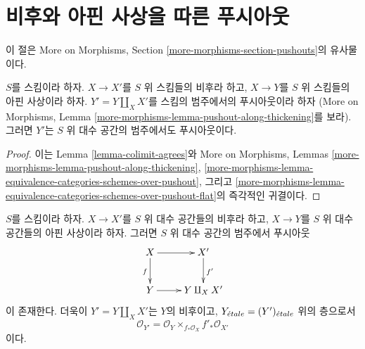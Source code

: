 \section{비후와 아핀 사상을 따른 푸시아웃}
\label{section-pushouts}

\noindent
이 절은 More on Morphisms, Section
\ref{more-morphisms-section-pushouts}의 유사물이다.

\begin{lemma}
\label{lemma-pushout-along-thickening-schemes}
$S$를 스킴이라 하자. $X \to X'$를 $S$ 위 스킴들의 비후라 하고,
$X \to Y$를 $S$ 위 스킴들의 아핀 사상이라 하자.
$Y' = Y \amalg_X X'$를 스킴의 범주에서의 푸시아웃이라 하자
(More on Morphisms, Lemma
\ref{more-morphisms-lemma-pushout-along-thickening}를 보라).
그러면 $Y'$는 $S$ 위 대수 공간의 범주에서도 푸시아웃이다.
\end{lemma}

\begin{proof}
이는 Lemma \ref{lemma-colimit-agrees}와 More on Morphisms, Lemmas
\ref{more-morphisms-lemma-pushout-along-thickening},
\ref{more-morphisms-lemma-equivalence-categories-schemes-over-pushout}, 그리고
\ref{more-morphisms-lemma-equivalence-categories-schemes-over-pushout-flat}의
즉각적인 귀결이다.
\end{proof}

\begin{lemma}
\label{lemma-pushout-along-thickening}
$S$를 스킴이라 하자. $X \to X'$를 $S$ 위 대수 공간들의 비후라 하고,
$X \to Y$를 $S$ 위 대수 공간들의 아핀 사상이라 하자.
그러면 $S$ 위 대수 공간의 범주에서 푸시아웃
$$
\xymatrix{
X \ar[r] \ar[d]_f
&
X' \ar[d]^{f'}
\\
Y \ar[r]
&
Y \amalg_X X'
}
$$
이 존재한다. 더욱이 $Y' = Y \amalg_X X'$는 $Y$의 비후이고,
$Y_{\acute{e}tale} = (Y')_{\acute{e}tale}$ 위의 층으로서
$$
\mathcal{O}_{Y'} = \mathcal{O}_Y \times_{f_*\mathcal{O}_X} f'_*\mathcal{O}_{X'}
$$
이다.
\end{lemma}

